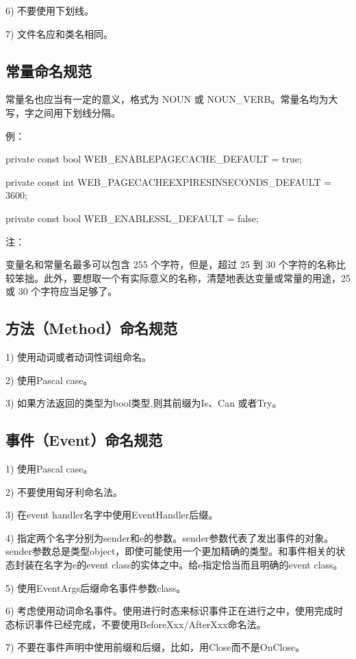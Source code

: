 \documentclass{book}
\begin{document}
6)  不要使用下划线。

7)  文件名应和类名相同。

\subsection{常量命名规范}

常量名也应当有一定的意义，格式为 NOUN 或 NOUN\_VERB。常量名均为大写，字之间用下划线分隔。

例：

     private const bool   WEB\_ENABLEPAGECACHE\_DEFAULT           = true;

     private const int    WEB\_PAGECACHEEXPIRESINSECONDS\_DEFAULT = 3600;

     private const bool   WEB\_ENABLESSL\_DEFAULT                 = false;

注：

变量名和常量名最多可以包含 255 个字符，但是，超过 25 到 30 个字符的名称比较笨拙。此外，要想取一个有实际意义的名称，清楚地表达变量或常量的用途，25 或 30 个字符应当足够了。

\subsection{方法（Method）命名规范}

1)  使用动词或者动词性词组命名。

2)  使用Pascal case。

3) 如果方法返回的类型为bool类型,则其前缀为Is、Can 或者Try。

\subsection{事件（Event）命名规范}

1)  使用Pascal case。

2)  不要使用匈牙利命名法。

3)  在event handler名字中使用EventHandler后缀。

4)  指定两个名字分别为sender和e的参数。sender参数代表了发出事件的对象。sender参数总是类型object，即使可能使用一个更加精确的类型。和事件相关的状态封装在名字为e的event class的实体之中。给e指定恰当而且明确的event class。

5)  使用EventArgs后缀命名事件参数class。

6)  考虑使用动词命名事件。使用进行时态来标识事件正在进行之中，使用完成时态标识事件已经完成，不要使用BeforeXxx/AfterXxx命名法。

7)  不要在事件声明中使用前缀和后缀，比如，用Close而不是OnClose。
\end{document}
